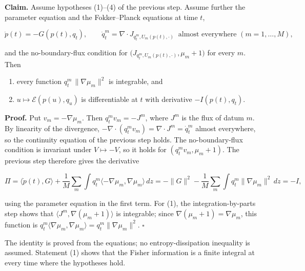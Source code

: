 \documentclass[11pt,a4paper]{report}
\begin{document}
\textbf{Claim.} Assume hypotheses (1)–(4) of the previous step. Assume further the parameter equation and the Fokker–Planck equations at time \(t\),


\[\dot p(t)=-G(p(t),q_t),\qquad\dot q^m_t=\nabla\cdot J_{q^m_t,U_m(p(t),\cdot)}\ \text{ almost everywhere }(m=1,\dots,M),\]


and the no-boundary-flux condition for \(\bigl(J_{q^m_t,U_m(p(t),\cdot)},\mu_m+1\bigr)\) for every \(m\). Then



\begin{enumerate}


\item every function \(q^m_t\,\|\nabla\mu_m\|^2\) is integrable, and

\item \(u\mapsto\mathcal E(p(u),q_u)\) is differentiable at \(t\) with derivative \(-I(p(t),q_t)\).

\end{enumerate}



\textbf{Proof.} Put \(v_m=-\nabla\mu_m\). Then \(q^m_tv_m=-J^m\), where \(J^m\) is the flux of datum \(m\). By linearity of the divergence, \(-\nabla\cdot(q^m_tv_m)=\nabla\cdot J^m=\dot q^m_t\) almost everywhere, so the continuity equation of the previous step holds. The no-boundary-flux condition is invariant under \(V\mapsto-V\), so it holds for \((q^m_tv_m,\mu_m+1)\). The previous step therefore gives the derivative


\[\Pi=\langle\dot p(t),G\rangle+\frac1M\sum_m\int q^m_t\langle-\nabla\mu_m,\nabla\mu_m\rangle\,dz=-\|G\|^2-\frac1M\sum_m\int q^m_t\|\nabla\mu_m\|^2\,dz=-I,\]


using the parameter equation in the first term. For (1), the integration-by-parts step shows that \(\langle J^m,\nabla(\mu_m+1)\rangle\) is integrable; since \(\nabla(\mu_m+1)=\nabla\mu_m\), this function is \(q^m_t\langle\nabla\mu_m,\nabla\mu_m\rangle=q^m_t\|\nabla\mu_m\|^2\). \(\square\)




The identity is proved from the equations; no entropy-dissipation inequality is assumed. Statement (1) shows that the Fisher information is a finite integral at every time where the hypotheses hold.
\end{document}
